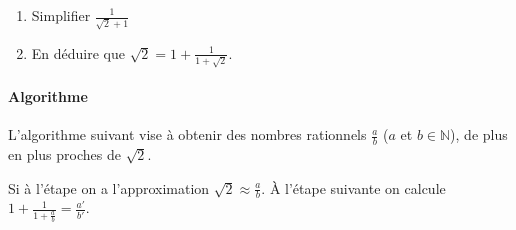 \bigskip
\begin{exercise}[Rappel] \hfill 
	\begin{enumerate}[label={\alph*)}, leftmargin=*]
		\item Simplifier $\frac{1}{\sqrt{2}+1}$
		\item En déduire que $\sqrt{2}=1+\frac{1}{1+\sqrt{2}}$.
	\end{enumerate} 
\end{exercise}
\paragraph{Algorithme}  L'algorithme suivant vise à obtenir des nombres rationnels $\frac{a}{b}$ ($a$ et $b\in\mathbb{N}$), de plus en plus proches de $\sqrt{2}$.

Si à l'étape on a l'approximation $\sqrt{2}\approx \frac{a}{b}$. 
À l'étape suivante on calcule $ 1+\frac{1}{1+\frac{a}{b}}= \frac{a'}{b'}$. 

